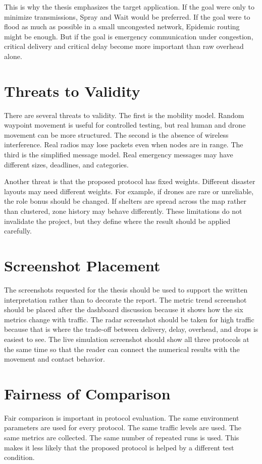 This is why the thesis emphasizes the target application. If the goal were only to minimize transmissions, Spray and Wait would be preferred. If the goal were to flood as much as possible in a small uncongested network, Epidemic routing might be enough. But if the goal is emergency communication under congestion, critical delivery and critical delay become more important than raw overhead alone.

\section{Threats to Validity}
There are several threats to validity. The first is the mobility model. Random waypoint movement is useful for controlled testing, but real human and drone movement can be more structured. The second is the absence of wireless interference. Real radios may lose packets even when nodes are in range. The third is the simplified message model. Real emergency messages may have different sizes, deadlines, and categories.

Another threat is that the proposed protocol has fixed weights. Different disaster layouts may need different weights. For example, if drones are rare or unreliable, the role bonus should be changed. If shelters are spread across the map rather than clustered, zone history may behave differently. These limitations do not invalidate the project, but they define where the result should be applied carefully.

\section{Screenshot Placement}
The screenshots requested for the thesis should be used to support the written interpretation rather than to decorate the report. The metric trend screenshot should be placed after the dashboard discussion because it shows how the six metrics change with traffic. The radar screenshot should be taken for high traffic because that is where the trade-off between delivery, delay, overhead, and drops is easiest to see. The live simulation screenshot should show all three protocols at the same time so that the reader can connect the numerical results with the movement and contact behavior.

\section{Fairness of Comparison}
Fair comparison is important in protocol evaluation. The same environment parameters are used for every protocol. The same traffic levels are used. The same metrics are collected. The same number of repeated runs is used. This makes it less likely that the proposed protocol is helped by a different test condition.


